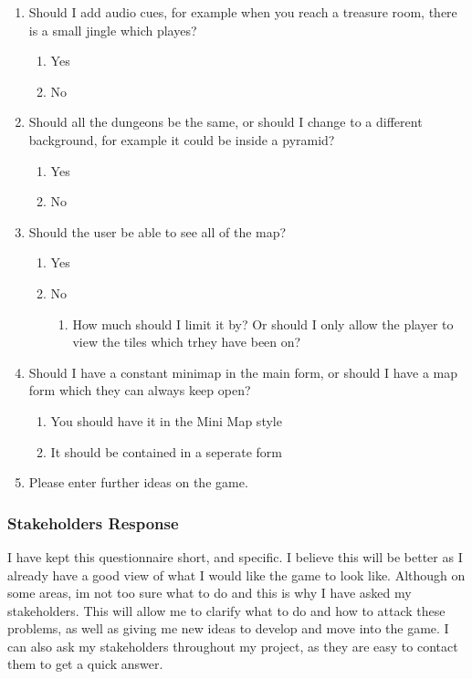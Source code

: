 \documentclass[14pt]{article}
\begin{document}
\begin{enumerate}
	\item{Should I add audio cues, for example when you reach a treasure room, there is a small jingle which playes?}
		\begin{enumerate}
		\item Yes
		\item No
		\end{enumerate}
			
	\item{Should all the dungeons be the same, or should I change to a different background, for example it could be inside a pyramid?}
		\begin{enumerate}
		\item Yes
		\item No
		\end{enumerate}

	\item{Should the user be able to see all of the map?}
		\begin{enumerate}
		\item Yes
		\item No
			\begin{enumerate}
				\item How much should I limit it by? Or should I only allow the player to view the tiles which trhey have been on?
			\end{enumerate}
		\end{enumerate}

			
	\item{Should I have a constant minimap in the main form, or should I have a map form which they can always keep open?}
		\begin{enumerate}
		\item You should have it in the Mini Map style
		\item It should be contained in a seperate form
		\end{enumerate}
			
	\item{Please enter further ideas on the game.}
\end{enumerate}	



			\subsubsection{Stakeholders Response}


I have kept this questionnaire short, and specific. I believe this will be better as I already have a good view of what I would like the game to look like. Although on some areas, im not too sure what to do and this is why I have asked my stakeholders. This will allow me to clarify what to do and how to attack these problems, as well as giving me new ideas to develop and move into the game. I can also ask my stakeholders throughout my project, as they are easy to contact them to get a quick answer.
\end{document}
